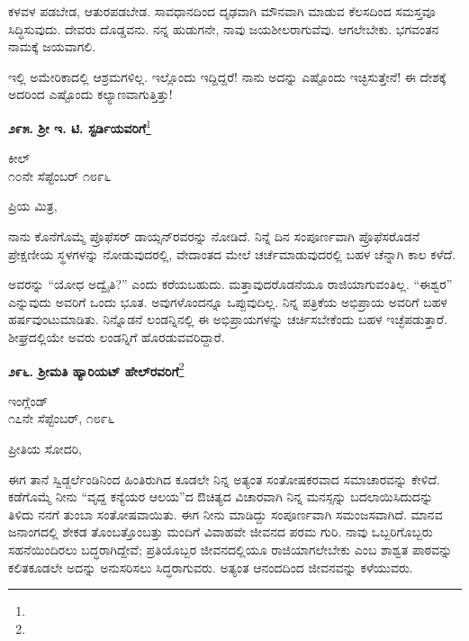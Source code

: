 ಕಳವಳ ಪಡಬೇಡ, ಆತುರಪಡಬೇಡ. ಸಾವಧಾನದಿಂದ ದೃಢವಾಗಿ ಮೌನವಾಗಿ ಮಾಡುವ ಕೆಲಸದಿಂದ ಸಮಸ್ತವೂ ಸಿದ್ಧಿಸುವುದು. ದೇವರು ದೊಡ್ಡವನು. ನನ್ನ ಹುಡುಗನೇ, ನಾವು ಜಯಶೀಲರಾಗುವೆವು. ಆಗಲೇಬೇಕು. ಭಗವಂತನ ನಾಮಕ್ಕೆ ಜಯವಾಗಲಿ.

ಇಲ್ಲಿ ಅಮೇರಿಕಾದಲ್ಲಿ ಆಶ್ರಮಗಳಿಲ್ಲ. ಇಲ್ಲೊಂದು ಇದ್ದಿದ್ದರೆ! ನಾನು ಅದನ್ನು ಎಷ್ಟೊಂದು ಇಚ್ಛಿಸುತ್ತೇನೆ! ಈ ದೇಶಕ್ಕೆ ಅದರಿಂದ ಎಷ್ಟೊಂದು ಕಲ್ಯಾಣವಾಗುತ್ತಿತ್ತು!

\begin{center}
\textbf{೨೯೫. ಶ‍್ರೀ ಇ. ಟಿ. ಸ್ಟರ್ಡಿಯವರಿಗೆ}\footnote{}
\end{center}

\vspace{-0.5cm}

\begin{flushright}
ಕೀಲ್\\೧೦ನೇ ಸೆಪ್ಟೆಂಬರ್ ೧೮೯೬
\end{flushright}

\noindent
ಪ್ರಿಯ ಮಿತ್ರ,

ನಾನು ಕೊನೆಗೊಮ್ಮೆ ಪ್ರೊಫೆಸರ್ ಡಾಯ್ಸನ್‌ರವರನ್ನು ನೋಡಿದೆ. ನಿನ್ನೆ ದಿನ ಸಂಪೂರ್ಣವಾಗಿ ಪ್ರೊಫೆಸರೊಡನೆ ಪ್ರೇಕ್ಷಣೀಯ ಸ್ಥಳಗಳನ್ನು ನೋಡುವುದರಲ್ಲಿ, ವೇದಾಂತದ ಮೇಲೆ ಚರ್ಚೆಮಾಡುವುದರಲ್ಲಿ ಬಹಳ ಚೆನ್ನಾಗಿ ಕಾಲ ಕಳೆದೆ.

ಅವರನ್ನು “ಯೋಧ ಅದ್ವೈತಿ?” ಎಂದು ಕರೆಯಬಹುದು. ಮತ್ತಾವುದರೊಡನೆಯೂ ರಾಜಿಯಾಗುವಂತಿಲ್ಲ. “ಈಶ್ವರ” ಎನ್ನುವುದು ಅವರಿಗೆ ಒಂದು ಭೂತ. ಅವುಗಳೊಂದನ್ನೂ ಒಪ್ಪುವುದಿಲ್ಲ. ನಿನ್ನ ಪತ್ರಿಕೆಯ ಅಭಿಪ್ರಾಯ ಅವರಿಗೆ ಬಹಳ ಹರ್ಷವುಂಟುಮಾಡಿತು. ನಿನ್ನೊಡನೆ ಲಂಡನ್ನಿನಲ್ಲಿ ಈ ಅಭಿಪ್ರಾಯಗಳನ್ನು ಚರ್ಚಿಸಬೇಕೆಂದು ಬಹಳ ಇಚ್ಛೆಪಡುತ್ತಾರೆ. ಶೀಘ್ರದಲ್ಲಿಯೇ ಅವರು ಲಂಡನ್ನಿಗೆ ಹೊರಡುವವರಿದ್ದಾರೆ.

\begin{center}
\textbf{೨೯೬. ಶ‍್ರೀಮತಿ ಹ್ಯಾರಿಯಟ್ ಹೇಲ್‌ರವರಿಗೆ}\footnote{}
\end{center}

\begin{flushright}
ಇಂಗ್ಲೆಂಡ್\\೧೭ನೇ ಸೆಪ್ಟೆಂಬರ್, ೧೮೯೬
\end{flushright}

\noindent
ಪ್ರೀತಿಯ ಸೋದರಿ,

ಈಗ ತಾನೆ ಸ್ವಿಡ್ಜರ್ಲೆಂಡಿನಿಂದ ಹಿಂತಿರುಗಿದ ಕೂಡಲೇ ನಿನ್ನ ಅತ್ಯಂತ ಸಂತೋಷಕರವಾದ ಸಮಾಚಾರವನ್ನು ಕೇಳಿದೆ. ಕಡೆಗೊಮ್ಮೆ ನೀನು “ವೃದ್ದ ಕನ್ಯೆಯರ ಆಲಯ”ದ ಔಚಿತ್ಯದ ವಿಚಾರವಾಗಿ ನಿನ್ನ ಮನಸ್ಸನ್ನು ಬದಲಾಯಿಸಿದುದನ್ನು ತಿಳಿದು ನನಗೆ ತುಂಬಾ ಸಂತೋಷವಾಯಿತು. ಈಗ ನೀನು ಮಾಡಿದ್ದು ಸಂಪೂರ್ಣವಾಗಿ ಸಮಂಜಸವಾಗಿದೆ. ಮಾನವ ಜನಾಂಗದಲ್ಲಿ ಶೇಕಡ ತೊಂಬತ್ತೊಂಬತ್ತು ಮಂದಿಗೆ ವಿವಾಹವೇ ಜೀವನದ ಪರಮ ಗುರಿ. ನಾವು ಒಬ್ಬರಿಗೊಬ್ಬರು ಸಹನೆಯಿಂದಿರಲು ಬದ್ಧರಾಗಿದ್ದೇವೆ; ಪ್ರತಿಯೊಬ್ಬರ ಜೀವನದಲ್ಲಿಯೂ ರಾಜಿಯಾಗಲೇಬೇಕು\enginline{-} ಎಂಬ ಶಾಶ್ವತ ಪಾಠವನ್ನು ಕಲಿತಕೂಡಲೇ ಅದನ್ನು ಅನುಸರಿಸಲು ಸಿದ್ಧರಾಗುವರು. ಅತ್ಯಂತ ಆನಂದದಿಂದ ಜೀವನವನ್ನು ಕಳೆಯುವರು.

